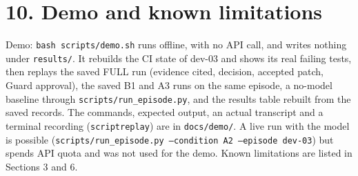 \documentclass[10pt,a4paper]{article}
\begin{document}
\section*{10. Demo and known limitations}
Demo: \texttt{bash scripts/demo.sh} runs offline, with no API call, and writes nothing under \texttt{results/}. It rebuilds the CI state of dev-03 and shows its real failing tests, then replays the saved FULL run (evidence cited, decision, accepted patch, Guard approval), the saved B1 and A3 runs on the same episode, a no-model baseline through \texttt{scripts/run\_episode.py}, and the results table rebuilt from the saved records. The commands, expected output, an actual transcript and a terminal recording (\texttt{scriptreplay}) are in \texttt{docs/demo/}. A live run with the model is possible (\texttt{scripts/run\_episode.py --condition A2 --episode dev-03}) but spends API quota and was not used for the demo. Known limitations are listed in Sections 3 and 6.
\end{document}
